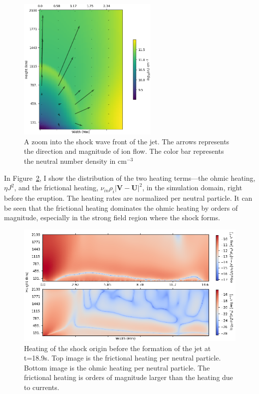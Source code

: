 \documentclass[12pt,upcase]{umlthesis}
\begin{document}
\begin{figure}[ht!]
		\centering
		\includegraphics[width=0.6\textwidth]{images/spiculeshock.eps}
		\caption{A zoom into the shock wave front of the jet. The arrows represents the direction and magnitude of ion flow. The color bar represents the neutral number density in cm$^{-3}$}\label{fig:spiculeshock}
\end{figure}

In Figure~\ref{fig:prespicule}, I show the distribution of the two heating terms---the ohmic heating, $\eta J^2$, and the frictional heating, $\nu_{in} \rho_i |\textbf{V} - \textbf{U}|^2$, in the simulation domain, right before the eruption. The heating rates are normalized per neutral particle. It can be seen that the frictional heating dominates the ohmic heating by orders of magnitude, especially in the strong field region where the shock forms.

\begin{figure}[ht!]
    \centering
    \includegraphics[width=1\textwidth]{images/prespicule.eps}
    \caption{Heating of the shock origin before the formation of the jet at t=18.9s. Top image is the frictional heating per neutral particle. Bottom image is the ohmic heating per neutral particle. The frictional heating is orders of magnitude larger than the heating due to currents.}\label{fig:prespicule}
\end{figure}
\end{document}

